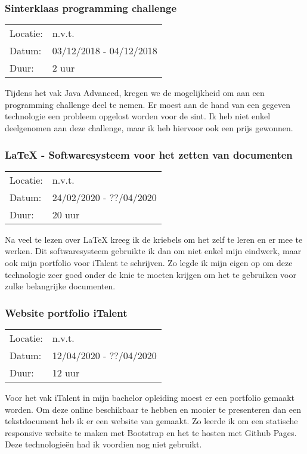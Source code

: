 \subsubsection{Sinterklaas programming challenge}

\begin{tabular}{l l}
  Locatie: & n.v.t.\\
  Datum: & 03/12/2018 - 04/12/2018\\
  Duur: & 2 uur
\end{tabular}

Tijdens het vak Java Advanced, kregen we de mogelijkheid om aan een programming challenge deel te nemen. Er moest aan de hand van een gegeven technologie een probleem opgelost worden voor de sint. Ik heb niet enkel deelgenomen aan deze challenge, maar ik heb hiervoor ook een prijs gewonnen.

\subsubsection{\LaTeX{} - Softwaresysteem voor het zetten van documenten}

\begin{tabular}{l l}
  Locatie: & n.v.t.\\
  Datum: & 24/02/2020 - ??/04/2020\\
  Duur: & 20 uur
\end{tabular}

Na veel te lezen over \LaTeX{} kreeg ik de kriebels om het zelf te leren en er mee te werken. Dit softwaresysteem gebruikte ik dan om niet enkel mijn eindwerk, maar ook mijn portfolio voor iTalent te schrijven. Zo legde ik mijn eigen op om deze technologie zeer goed onder de knie te moeten krijgen om het te gebruiken voor zulke belangrijke documenten.

\subsubsection{Website portfolio iTalent}

\begin{tabular}{l l}
  Locatie: & n.v.t.\\
  Datum: & 12/04/2020 - ??/04/2020\\
  Duur: & 12 uur
\end{tabular}

Voor het vak iTalent in mijn bachelor opleiding moest er een portfolio gemaakt worden. Om deze online beschikbaar te hebben en mooier te presenteren dan een tekstdocument heb ik er een website van gemaakt. Zo leerde ik om een statische responsive website te maken met Bootstrap en het te hosten met Github Pages. Deze technologie\"en had ik voordien nog niet gebruikt.